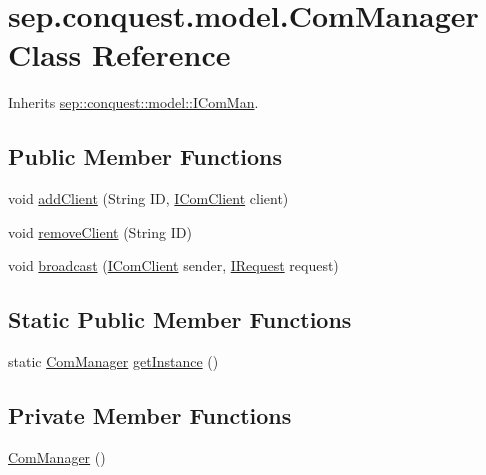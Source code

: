 \hypertarget{classsep_1_1conquest_1_1model_1_1_com_manager}{
\section{sep.conquest.model.ComManager Class Reference}
\label{classsep_1_1conquest_1_1model_1_1_com_manager}
}


Inherits \hyperlink{interfacesep_1_1conquest_1_1model_1_1_i_com_man}{sep::conquest::model::IComMan}.

\subsection*{Public Member Functions}
\begin{DoxyCompactItemize}
\item 
void \hyperlink{classsep_1_1conquest_1_1model_1_1_com_manager_ac0fd1e3e02c51cb13f8696c7139bab0b}{addClient} (String ID, \hyperlink{interfacesep_1_1conquest_1_1model_1_1_i_com_client}{IComClient} client)
\item 
void \hyperlink{classsep_1_1conquest_1_1model_1_1_com_manager_a99b3bc0da7eb0a2d9f1456d336e7064e}{removeClient} (String ID)
\item 
void \hyperlink{classsep_1_1conquest_1_1model_1_1_com_manager_a32b20666fb0ad023a17addc36b24c2b6}{broadcast} (\hyperlink{interfacesep_1_1conquest_1_1model_1_1_i_com_client}{IComClient} sender, \hyperlink{interfacesep_1_1conquest_1_1model_1_1_i_request}{IRequest} request)
\end{DoxyCompactItemize}
\subsection*{Static Public Member Functions}
\begin{DoxyCompactItemize}
\item 
static \hyperlink{classsep_1_1conquest_1_1model_1_1_com_manager}{ComManager} \hyperlink{classsep_1_1conquest_1_1model_1_1_com_manager_a8db465879daec5e6c738b0138a66e0b9}{getInstance} ()
\end{DoxyCompactItemize}
\subsection*{Private Member Functions}
\begin{DoxyCompactItemize}
\item 
\hyperlink{classsep_1_1conquest_1_1model_1_1_com_manager_a94907d33e691691ab2feb6da41dc1c64}{ComManager} ()
\end{DoxyCompactItemize}
